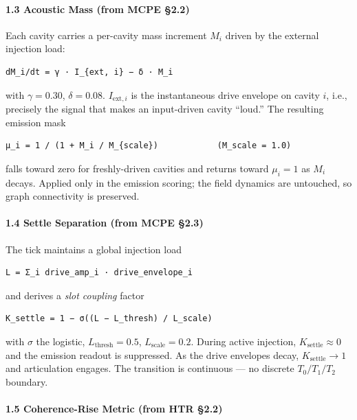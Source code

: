 \documentclass[
  11pt,
  a4paper,
]{article}
\begin{document}
\paragraph{1.3 Acoustic Mass (from MCPE
§2.2)}\label{acoustic-mass-from-mcpe-2.2}

Each cavity carries a per-cavity mass increment \(M_i\) driven by the
external injection load:

\begin{verbatim}
dM_i/dt = γ · I_{ext, i} − δ · M_i
\end{verbatim}

with \(\gamma = 0.30\), \(\delta = 0.08\). \(I_{\text{ext}, i}\) is the
instantaneous drive envelope on cavity \(i\), i.e., precisely the signal
that makes an input-driven cavity ``loud.'' The resulting emission mask

\begin{verbatim}
μ_i = 1 / (1 + M_i / M_{scale})            (M_scale = 1.0)
\end{verbatim}

falls toward zero for freshly-driven cavities and returns toward
\(\mu_i = 1\) as \(M_i\) decays. Applied only in the emission scoring;
the field dynamics are untouched, so graph connectivity is preserved.

\paragraph{1.4 Settle Separation (from MCPE
§2.3)}\label{settle-separation-from-mcpe-2.3}

The tick maintains a global injection load

\begin{verbatim}
L = Σ_i drive_amp_i · drive_envelope_i
\end{verbatim}

and derives a \emph{slot coupling} factor

\begin{verbatim}
K_settle = 1 − σ((L − L_thresh) / L_scale)
\end{verbatim}

with \(\sigma\) the logistic, \(L_{\text{thresh}} = 0.5\),
\(L_{\text{scale}} = 0.2\). During active injection,
\(K_{\text{settle}} \approx 0\) and the emission readout is suppressed.
As the drive envelopes decay, \(K_{\text{settle}} \to 1\) and
articulation engages. The transition is continuous --- no discrete
\(T_0 / T_1 / T_2\) boundary.

\paragraph{1.5 Coherence-Rise Metric (from HTR
§2.2)}\label{coherence-rise-metric-from-htr-2.2}
\end{document}
